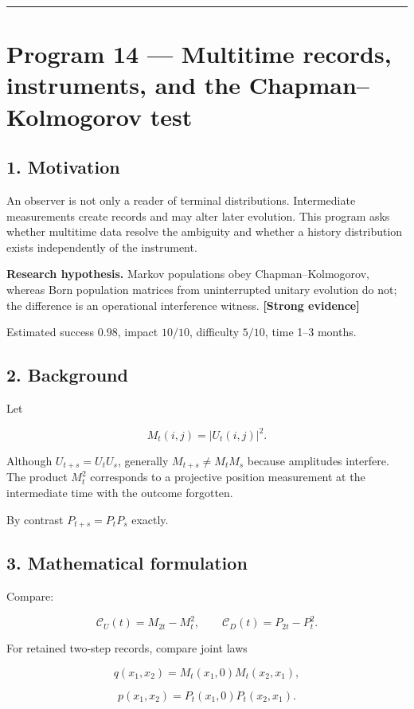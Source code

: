 \documentclass[11pt,a4paper,openany]{report}
\newcommand{\statusStrong}{\textcolor{finblue}{[Strong evidence]}}
\begin{document}
\par\medskip\hrule\medskip

\chapter{Program 14 — Multitime records, instruments, and the Chapman–Kolmogorov test}

\section{1. Motivation}

An observer is not only a reader of terminal distributions. Intermediate measurements create records and may alter later evolution. This program asks whether multitime data resolve the ambiguity and whether a history distribution exists independently of the instrument.

\textbf{Research hypothesis.} Markov populations obey Chapman–Kolmogorov, whereas Born population matrices from uninterrupted unitary evolution do not; the difference is an operational interference witness. \textbf{\statusStrong{}}

Estimated success \(0.98\), impact \(10/10\), difficulty \(5/10\), time 1–3 months.

\section{2. Background}

Let

\[
M_t(i,j)=|U_t(i,j)|^2.
\]

Although \(U_{t+s}=U_tU_s\), generally \(M_{t+s}\ne M_tM_s\) because amplitudes interfere. The product \(M_t^2\) corresponds to a projective position measurement at the intermediate time with the outcome forgotten.

By contrast \(P_{t+s}=P_tP_s\) exactly.

\section{3. Mathematical formulation}

Compare:

\[
\mathcal C_U(t)=M_{2t}-M_t^2,\qquad
\mathcal C_D(t)=P_{2t}-P_t^2.
\]

For retained two-step records, compare joint laws

\[
q(x_1,x_2)=M_t(x_1,0)M_t(x_2,x_1),
\]

\[
p(x_1,x_2)=P_t(x_1,0)P_t(x_2,x_1).
\]
\end{document}
